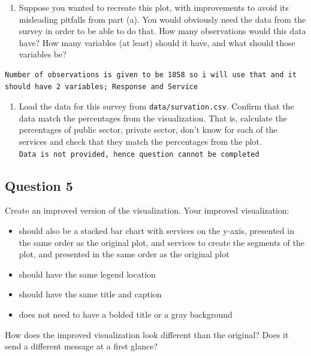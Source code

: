 \documentclass[
  letterpaper,
  DIV=11,
  numbers=noendperiod]{scrartcl}
\providecommand{\tightlist}{%
  \setlength{\itemsep}{0pt}\setlength{\parskip}{0pt}}
\begin{document}
\begin{enumerate}
\def\labelenumi{\alph{enumi}.}
\setcounter{enumi}{1}
\tightlist
\item
  Suppose you wanted to recreate this plot, with improvements to avoid
  its misleading pitfalls from part (a). You would obviously need the
  data from the survey in order to be able to do that. How many
  observations would this data have? How many variables (at least)
  should it have, and what should those variables be?
\end{enumerate}

\begin{verbatim}
Number of observations is given to be 1858 so i will use that and it should have 2 variables; Response and Service
\end{verbatim}

\begin{enumerate}
\def\labelenumi{\alph{enumi}.}
\setcounter{enumi}{2}
\tightlist
\item
  Load the data for this survey from \texttt{data/survation.csv}.
  Confirm that the data match the percentages from the visualization.
  That is, calculate the percentages of public sector, private sector,
  don't know for each of the services and check that they match the
  percentages from the plot.
  \texttt{Data\ is\ not\ provided,\ hence\ question\ cannot\ be\ completed}
\end{enumerate}

\subsection{Question 5}\label{question-5}

Create an improved version of the visualization. Your improved
visualization:

\begin{itemize}
\item
  should also be a stacked bar chart with services on the y-axis,
  presented in the same order as the original plot, and services to
  create the segments of the plot, and presented in the same order as
  the original plot
\item
  should have the same legend location
\item
  should have the same title and caption
\item
  does not need to have a bolded title or a gray background
\end{itemize}

How does the improved visualization look different than the original?
Does it send a different message at a first glance?
\end{document}
